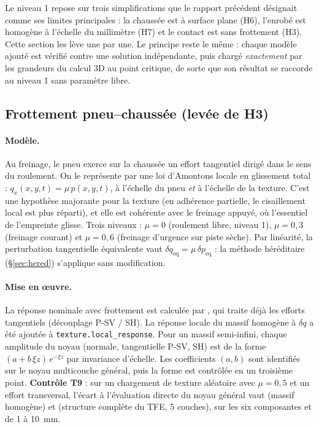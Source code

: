Le niveau 1 repose sur trois simplifications que le rapport précédent désignait comme ses limites
principales : la chaussée est à surface plane (H6), l'enrobé est homogène à l'échelle du
millimètre (H7) et le contact est sans frottement (H3). Cette section les lève une par une. Le
principe reste le même : chaque modèle ajouté est vérifié contre une solution indépendante, puis
chargé \emph{exactement} par les grandeurs du calcul 3D au point critique, de sorte que son
résultat se raccorde au niveau 1 sans paramètre libre.

\subsection{Frottement pneu--chaussée (levée de H3)}\label{sec:n2_frott}
\paragraph{Modèle.} Au freinage, le pneu exerce sur la chaussée un effort tangentiel dirigé dans
le sens du roulement. On le représente par une loi d'Amontons locale en glissement total :
$q_x(x,y,t)=\mu\,p(x,y,t)$, à l'échelle du pneu \emph{et} à l'échelle de la texture. C'est une
hypothèse majorante pour la texture (en adhérence partielle, le cisaillement local est plus
réparti), et elle est cohérente avec le freinage appuyé, où l'essentiel de l'empreinte glisse. Trois
niveaux : $\mu=0$ (roulement libre, niveau 1), $\mu=0{,}3$ (freinage courant) et $\mu=0{,}6$
(freinage d'urgence sur piste sèche). Par linéarité, la perturbation tangentielle équivalente vaut
$\delta q_{\text{eq}}=\mu\,\delta p_{\text{eq}}$ : la méthode héréditaire (\S\ref{sec:hered}) s'applique
sans modification.

\paragraph{Mise en œuvre.} La réponse nominale avec frottement est calculée par \cs, qui traite
déjà les efforts tangentiels (découplage P-SV / SH). La réponse locale du massif homogène à
$\delta q$ a été ajoutée à \texttt{texture.local\_response}. Pour un massif semi-infini, chaque
amplitude du noyau (normale, tangentielle P-SV, SH) est de la forme $(a+b\,\xi z)\,e^{-\xi z}$
par invariance d'échelle. Les coefficients $(a,b)$ sont identifiés sur le noyau multicouche
général, puis la forme est contrôlée en un troisième point. \textbf{Contrôle T9} : sur un
chargement de texture aléatoire avec $\mu=0{,}5$ et un effort transversal, l'écart à l'évaluation
directe du noyau général vaut \NtNeufHomo{} (massif homogène) et \NtNeufTFE{} (structure complète
du TFE, 5 couches), sur les six composantes et de 1 à \SI{10}{mm}.

